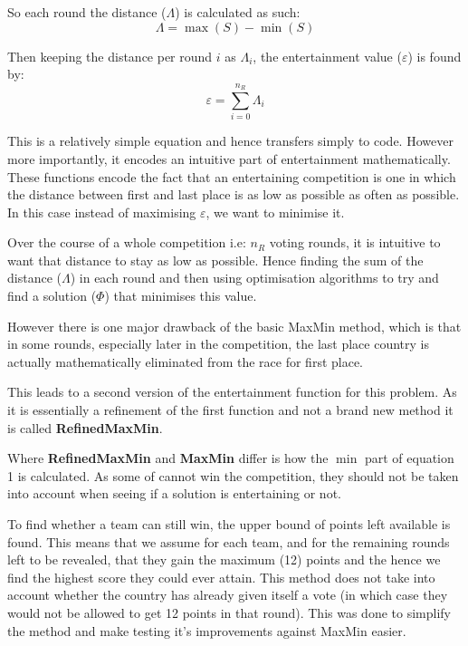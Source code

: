 \documentclass[12pt]{report}
\begin{document}
So each round the distance ($\Lambda$) is calculated as such:
\begin{equation}
	\Lambda = \max(S) - \min(S)
\end{equation}

Then keeping the distance per round $i$ as $\Lambda_i$, the entertainment value ($\varepsilon$) is found by:
\begin{equation}
	\varepsilon = \sum_{i=0}^{n_R}  \Lambda_i
\end{equation}

This is a relatively simple equation and hence transfers simply to code. However more importantly, it encodes an intuitive part of entertainment mathematically. These functions encode the fact that an entertaining competition is one in which the distance between first and last place is as low as possible as often as possible. In this case instead of maximising $\varepsilon$, we want to minimise it.

Over the course of a whole competition i.e: $n_R$ voting rounds, it is intuitive to want that distance to stay as low as possible. Hence finding the sum of the distance ($\Lambda$) in each round and then using optimisation algorithms to try and find a solution ($\Phi$) that minimises this value.

However there is one major drawback of the basic MaxMin method, which is that in some rounds, especially later in the competition, the last place country is actually mathematically eliminated from the race for first place.

This leads to a second version of the entertainment function for this problem. As it is essentially a refinement of the first function and not a brand new method it is called \textbf{RefinedMaxMin}.

Where \textbf{RefinedMaxMin} and \textbf{MaxMin} differ is how the $\min$ part of equation 1 is calculated. As some of cannot win the competition, they should not be taken into account when seeing if a solution is entertaining or not.

To find whether a team can still win, the upper bound of points left available is found. This means that we assume for each team, and for the remaining rounds left to be revealed, that they gain the maximum (12) points and the hence we find the highest score they could ever attain. This method does not take into account whether the country has already given itself a vote (in which case they would not be allowed to get 12 points in that round). This was done to simplify the method and make testing it's improvements against MaxMin easier.
\end{document}
